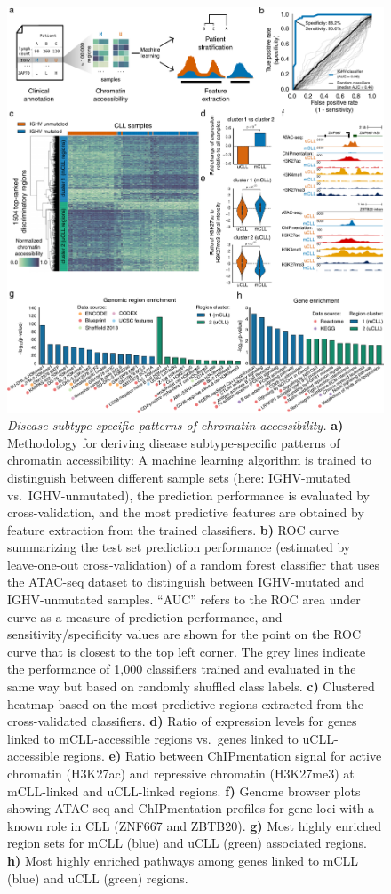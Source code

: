\documentclass[10pt,]{article}
\begin{document}
\begin{figure}
\centering
\includegraphics[width=0.850\hsize]{figures/Figure3.pdf}
\caption{\emph{Disease subtype-specific patterns of chromatin
accessibility.} \textbf{a)} Methodology for deriving disease
subtype-specific patterns of chromatin accessibility: A machine learning
algorithm is trained to distinguish between different sample sets (here:
IGHV-mutated vs.~IGHV-unmutated), the prediction performance is
evaluated by cross-validation, and the most predictive features are
obtained by feature extraction from the trained classifiers. \textbf{b)}
ROC curve summarizing the test set prediction performance (estimated by
leave-one-out cross-validation) of a random forest classifier that uses
the ATAC-seq dataset to distinguish between IGHV-mutated and
IGHV-unmutated samples. ``AUC'' refers to the ROC area under curve as a
measure of prediction performance, and sensitivity/specificity values
are shown for the point on the ROC curve that is closest to the top left
corner. The grey lines indicate the performance of 1,000 classifiers
trained and evaluated in the same way but based on randomly shuffled
class labels. \textbf{c)} Clustered heatmap based on the most predictive
regions extracted from the cross-validated classifiers. \textbf{d)}
Ratio of expression levels for genes linked to mCLL-accessible regions
vs.~genes linked to uCLL-accessible regions. \textbf{e)} Ratio between
ChIPmentation signal for active chromatin (H3K27ac) and repressive
chromatin (H3K27me3) at mCLL-linked and uCLL-linked regions. \textbf{f)}
Genome browser plots showing ATAC-seq and ChIPmentation profiles for
gene loci with a known role in CLL (ZNF667 and ZBTB20). \textbf{g)} Most
highly enriched region sets for mCLL (blue) and uCLL (green) associated
regions. \textbf{h)} Most highly enriched pathways among genes linked to
mCLL (blue) and uCLL (green) regions.}\label{Figure3}
\end{figure}
\end{document}
